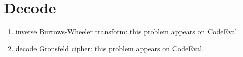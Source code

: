\section{Decode}
\begin{enumerate}
\item inverse \href{https://en.wikipedia.org/wiki/Burrows\%E2\%80\%93Wheeler_transform}{Burrows-Wheeler transform}: this problem appears on \href{https://www.codeeval.com/open_challenges/184}{CodeEval}.
\item decode \href{https://en.wikipedia.org/wiki/Vigen\%C3\%A8re_cipher}{Gronsfeld cipher}: this problem appears on \href{https://www.codeeval.com/open_challenges/181/}{CodeEval}.
\end{enumerate}

\printbibliography[heading=subbibliography]
